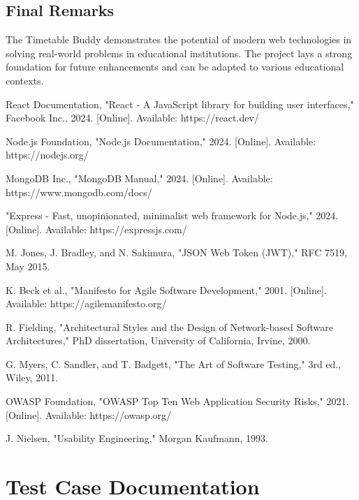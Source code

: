 \documentclass[12pt,a4paper]{report}
\begin{document}
\section{Final Remarks}
The Timetable Buddy demonstrates the potential of modern web technologies in solving real-world problems in educational institutions. The project lays a strong foundation for future enhancements and can be adapted to various educational contexts.

\begin{thebibliography}{99}

React Documentation, "React - A JavaScript library for building user interfaces," Facebook Inc., 2024. [Online]. Available: https://react.dev/

Node.js Foundation, "Node.js Documentation," 2024. [Online]. Available: https://nodejs.org/

MongoDB Inc., "MongoDB Manual," 2024. [Online]. Available: https://www.mongodb.com/docs/

"Express - Fast, unopinionated, minimalist web framework for Node.js," 2024. [Online]. Available: https://expressjs.com/

M. Jones, J. Bradley, and N. Sakimura, "JSON Web Token (JWT)," RFC 7519, May 2015.

K. Beck et al., "Manifesto for Agile Software Development," 2001. [Online]. Available: https://agilemanifesto.org/

R. Fielding, "Architectural Styles and the Design of Network-based Software Architectures," PhD dissertation, University of California, Irvine, 2000.

G. Myers, C. Sandler, and T. Badgett, "The Art of Software Testing," 3rd ed., Wiley, 2011.

OWASP Foundation, "OWASP Top Ten Web Application Security Risks," 2021. [Online]. Available: https://owasp.org/

J. Nielsen, "Usability Engineering," Morgan Kaufmann, 1993.

\end{thebibliography}

\appendix

\chapter{Test Case Documentation}
\end{document}
